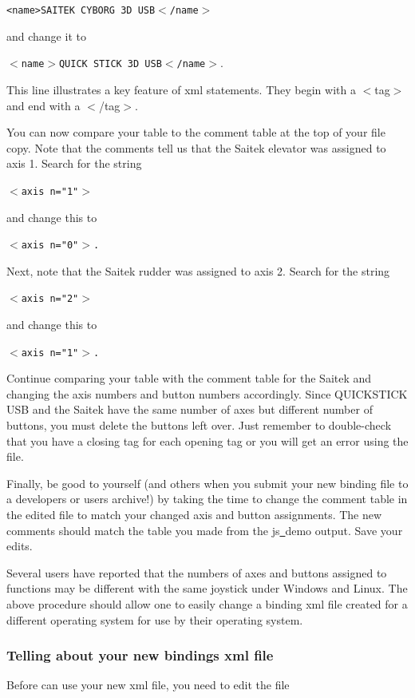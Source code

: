 {\texttt{<name>SAITEK CYBORG 3D USB$<$/name$>$}
\medskip

\noindent
and change it to
\medskip

	\texttt{$<$name$>$QUICK STICK 3D USB$<$/name$>$}.
	\medskip

\noindent
This line illustrates a key feature of xml statements.  They begin with a $<$tag$>$ and end with a $<$/tag$>$.

You can now compare your table to the comment table at the top of your file copy.  Note that the comments tell us that the Saitek elevator was assigned to axis 1.  Search for the string
\medskip

	\texttt{$<$axis n="1"$>$}
\medskip

\noindent
and change this to
\medskip

	\texttt{$<$axis n="0"$>$.}
\medskip

Next, note that the Saitek rudder was assigned to axis 2.  Search for the string
\medskip

	\texttt{$<$axis n="2"$>$}

\noindent
and change this to
\medskip

	\texttt{$<$axis n="1"$>$.}
\medskip

\noindent
Continue comparing your table with the comment table for the Saitek and changing the axis numbers and button numbers accordingly.  Since QUICKSTICK USB and the Saitek have the same number of axes but different number of buttons, you must delete the buttons left over.  Just remember to double-check that you have a closing tag for each opening tag or you will get an error using the file.

Finally, be good to yourself (and others when you submit your new binding file to a \FlightGear{} developers or users archive!) by taking the time to change the comment table in the edited file to match your changed axis and button assignments.  The new comments should match the table you made from the js\underline{~}demo output.  Save your edits.

Several users have reported that the numbers of axes and buttons assigned to functions may be different with the same joystick under Windows and Linux.  The above procedure should allow one to easily change a binding xml file created for a different operating system for use by their operating system.

\subsubsection{Telling \FlightGear{} about your new bindings xml file\label{telling}}
Before \FlightGear{} can use your new xml file, you need to edit the file

}
